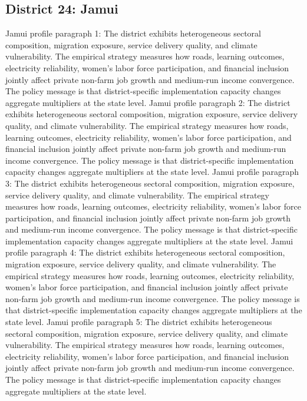 \documentclass[preprint,12pt]{elsarticle}
\begin{document}
\subsection{District 24: Jamui}
Jamui profile paragraph 1: The district exhibits heterogeneous sectoral composition, migration exposure, service delivery quality, and climate vulnerability. The empirical strategy measures how roads, learning outcomes, electricity reliability, women's labor force participation, and financial inclusion jointly affect private non-farm job growth and medium-run income convergence. The policy message is that district-specific implementation capacity changes aggregate multipliers at the state level.
Jamui profile paragraph 2: The district exhibits heterogeneous sectoral composition, migration exposure, service delivery quality, and climate vulnerability. The empirical strategy measures how roads, learning outcomes, electricity reliability, women's labor force participation, and financial inclusion jointly affect private non-farm job growth and medium-run income convergence. The policy message is that district-specific implementation capacity changes aggregate multipliers at the state level.
Jamui profile paragraph 3: The district exhibits heterogeneous sectoral composition, migration exposure, service delivery quality, and climate vulnerability. The empirical strategy measures how roads, learning outcomes, electricity reliability, women's labor force participation, and financial inclusion jointly affect private non-farm job growth and medium-run income convergence. The policy message is that district-specific implementation capacity changes aggregate multipliers at the state level.
Jamui profile paragraph 4: The district exhibits heterogeneous sectoral composition, migration exposure, service delivery quality, and climate vulnerability. The empirical strategy measures how roads, learning outcomes, electricity reliability, women's labor force participation, and financial inclusion jointly affect private non-farm job growth and medium-run income convergence. The policy message is that district-specific implementation capacity changes aggregate multipliers at the state level.
Jamui profile paragraph 5: The district exhibits heterogeneous sectoral composition, migration exposure, service delivery quality, and climate vulnerability. The empirical strategy measures how roads, learning outcomes, electricity reliability, women's labor force participation, and financial inclusion jointly affect private non-farm job growth and medium-run income convergence. The policy message is that district-specific implementation capacity changes aggregate multipliers at the state level.
\end{document}
